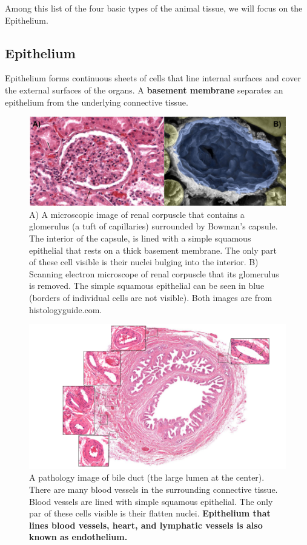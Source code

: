 Among this list of the four basic types of the animal tissue, we will focus on the Epithelium.

\subsection{Epithelium}
Epithelium forms continuous sheets of cells that line internal surfaces and cover the external surfaces of the organs. A \textbf{basement membrane} separates an epithelium from the underlying connective tissue. 


\begin{figure}[h!]
	\centering
	\includegraphics[width=0.8\linewidth]{images/histologySquamousEpithelial}
	\captionsetup{width=0.9\textwidth} 
	\caption{A) A microscopic image of renal corpuscle that contains a glomerulus (a tuft of capillaries) surrounded by Bowman's capsule. The interior of the capsule, is lined with a simple squamous epithelial that rests on a thick basement membrane. The only part of these cell visible is their nuclei bulging into the interior. B) Scanning electron microscope of renal corpuscle that its glomerulus is removed. The simple squamous epithelial can be seen in blue (borders of individual cells are not visible). Both images are from histologyguide.com.   }
	\label{fig:histologysquamousepithelial}
\end{figure}
\FloatBarrier

\begin{figure}[h!]
	\centering
	\includegraphics[width=0.8\linewidth]{images/bileDuct-SquamousEpithelialCells.png}
	\captionsetup{width=0.9\textwidth} 
	\caption{A pathology image of bile duct (the large lumen at the center). There are many blood vessels in the surrounding connective tissue. Blood vessels are lined with simple squamous epithelial. The only par of these cells visible is their flatten nuclei. \textbf{Epithelium that lines blood vessels, heart, and lymphatic vessels is also known as endothelium.}}

\end{figure}



